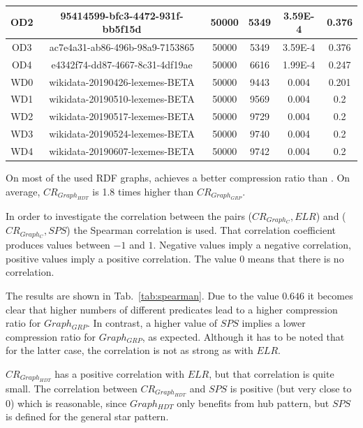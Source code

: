 \begin{center}
\begin{tabular}{|c|c|c|c|c|c|}
		\hline
		OD2 & 95414599-bfc3-4472-931f-bb5f15d & 50000 & 5349 & 3.59E-4 & 0.376 \\
		\hline
		OD3 & ac7e4a31-ab86-496b-98a9-7153865 & 50000 & 5349 & 3.59E-4 & 0.376 \\
		\hline
		OD4 & e4342f74-dd87-4667-8c31-4df19ae & 50000 & 6616 & 1.99E-4 & 0.247 \\
		\hline
		\hline
		WD0 & wikidata-20190426-lexemes-BETA & 50000 & 9443 & 0.004 & 0.201 \\
		\hline
		WD1 & wikidata-20190510-lexemes-BETA & 50000 & 9569 & 0.004 & 0.2 \\
		\hline
		WD2 & wikidata-20190517-lexemes-BETA & 50000 & 9729 & 0.004 & 0.2 \\
		\hline
		WD3 & wikidata-20190524-lexemes-BETA & 50000 & 9740 & 0.004 & 0.2 \\
		\hline
		WD4 & wikidata-20190607-lexemes-BETA & 50000 & 9742 & 0.004 & 0.2 \\
		\hline
	\end{tabular} 
	\label{tab:comparisonDatasets}
\end{center}

On most of the used RDF graphs, \GGRP{} achieves a better compression ratio than \GHDT{}. On average, $CR_{Graph_{HDT}}$ is 1.8 times higher than $CR_{Graph_{GRP}}$.

In order to investigate the correlation between the pairs ($CR_{Graph_C},ELR$) and ($CR_{Graph_C},SPS$) the Spearman correlation is used. That correlation coefficient produces values between $ -1 $ and $ 1 $. Negative values imply a negative correlation, positive values imply a positive correlation. The value 0 means that there is no correlation.~\cite{spearman} 

The results are shown in Tab.~\ref{tab:spearman}. Due to the value $0.646$ it becomes clear that higher numbers of different predicates lead to a higher compression ratio for $Graph_{GRP}$. In contrast, a higher value of $SPS$ implies a lower compression ratio for $Graph_{GRP}$, as expected. Although it has to be noted that for the latter case, the correlation is not as strong as with $ELR$. 

$CR_{Graph_{HDT}}$ has a positive correlation with $ELR$, but that correlation is quite small. The correlation between $CR_{Graph_{HDT}}$ and $SPS$ is positive (but very close  to 0) which is reasonable, since $Graph_{HDT}$ only benefits from hub pattern, but $SPS$ is defined for the general star pattern.

